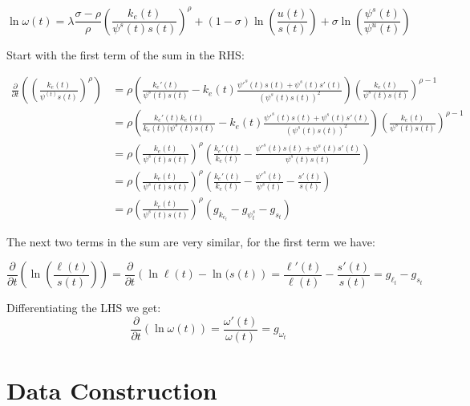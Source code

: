 \documentclass[12pt]{article}
\begin{document}
\begin{equation}\label{eq:skill_premium_log_linear_continuous}
 \ln{\omega(t)} = \lambda \frac{\sigma-\rho}{\rho}\left(\frac{k_{e}(t)}{\psi^s(t) s(t) }\right)^\rho + (1-\sigma)\ln{\left(\frac{u(t)}{s(t)}\right)} + \sigma\ln{\left(\frac{\psi^s(t)}{\psi^u(t)}\right)}
\end{equation}
 
Start with the first term of the sum in the RHS:

\begin{align*}
 \frac{\partial}{\partial t}\left(\left(\frac{k_{e}(t)}{\psi^(t) s(t) }\right)^\rho\right) &= \rho\left( \frac{ k_e'(t)}{\psi^s(t) s(t)} - k_e(t) \frac{\psi'^s(t) s(t) + \psi^s(t) s'(t)}{(\psi^s(t) s(t))^2} \right)\left(\frac{k_{e}(t)}{\psi^s(t) s(t) }\right)^{\rho-1} \\
 &= \rho\left( \frac{ k_e'(t) k_e(t)}{k_e(t)(\psi^s(t) s(t)} - k_e(t) \frac{\psi'^s(t) s(t) + \psi^s(t) s'(t)}{(\psi^s(t) s(t))^2} \right)\left(\frac{k_{e}(t)}{\psi^s(t) s(t) }\right)^{\rho-1}\\
 &= \rho\left(\frac{k_e(t)}{\psi^s(t) s(t)}\right)^{\rho} \left( \frac{ k_e'(t) }{k_e(t)} - \frac{\psi'^s(t) s(t) + \psi^s(t) s'(t)}{\psi^s(t) s(t)} \right)\\
 &= \rho\left(\frac{k_e(t)}{\psi^s(t) s(t)}\right)^{\rho} \left( \frac{ k_e'(t) }{k_e(t)} - \frac{\psi'^s(t)}{\psi^s(t)} - \frac{ s'(t)}{ s(t)} \right)\\
 &= \rho\left(\frac{k_e(t)}{\psi^s(t) s(t)}\right)^{\rho}(g_{k_{e_{t}}} - g_{\psi^s_t} - g_{s_t})
\end{align*}

The next two terms in the sum are very similar, for the first term we have:

\begin{equation}
 \frac{\partial}{\partial t} \left( \ln{\left( \frac{\ell(t) }{s(t)} \right)} \right) = \frac{\partial}{\partial t} \left( \ln{\ell(t)} - \ln{(s(t)} \right) = \frac{\ell'(t)}{\ell(t)} - \frac{s'(t)}{s(t)} = g_{\ell_t} - g_{s_t}
\end{equation}
 
Differentiating the LHS we get:
$$\frac{\partial}{\partial t}\left(\ln{\omega(t)}\right) = \frac{\omega'(t)}{\omega(t)} = g_{\omega_t}$$


\section{Data Construction}\label{sec:data-construction}
\end{document}
